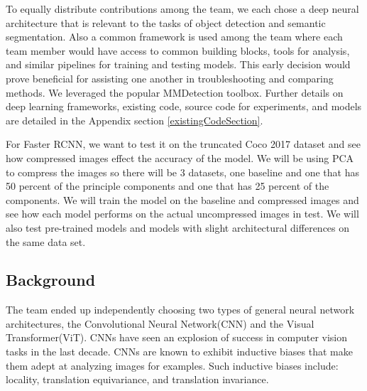 \documentclass[10pt,twocolumn,letterpaper]{article}
\begin{document}
To equally distribute contributions among the team, we each chose a deep neural architecture that is relevant to the tasks of object detection and semantic segmentation. Also a common framework is used among the team where each team member would have access to common building blocks, tools for analysis, and similar pipelines for training and testing models. This early decision would prove beneficial for assisting one another in troubleshooting and comparing methods. We leveraged the popular MMDetection\cite{mmdetection} toolbox. Further details on deep learning frameworks, existing code, source code for experiments, and models are detailed in the Appendix section \ref{existingCodeSection}.

For Faster RCNN, we want to test it on the truncated Coco 2017 dataset and see how compressed images effect the accuracy of the model. We will be using PCA to compress the images so there will be 3 datasets, one baseline and one that has 50 percent of the principle components and one that has 25 percent of the components. We will train the model on the baseline and compressed images and see how each model performs on the actual uncompressed images in test. We will also test pre-trained models and models with slight architectural differences on the same data set. 




\subsection{Background}

The team ended up independently choosing two types of general neural network architectures, the Convolutional Neural Network(CNN) and the Visual Transformer(ViT). CNNs have seen an explosion of success in computer vision tasks in the last decade. CNNs are known to exhibit inductive biases that make them adept at analyzing images for examples. Such inductive biases include: locality, translation equivariance, and translation invariance. 
\end{document}
